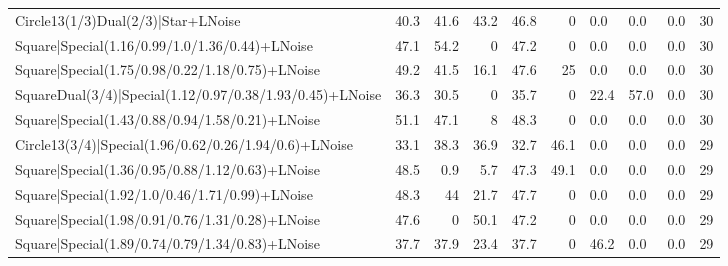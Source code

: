 \begin{tabular}{lrrrrrlllr}
 Circle13(1/3)Dual(2/3)|Star+LNoise                              &            40.3 &            41.6 &            43.2 &            46.8 &            0   & 0.0             & 0.0            & 0.0            &           30 \\
 Square|Special(1.16/0.99/1.0/1.36/0.44)+LNoise                  &            47.1 &            54.2 &             0   &            47.2 &            0   & 0.0             & 0.0            & 0.0            &           30 \\
 Square|Special(1.75/0.98/0.22/1.18/0.75)+LNoise                 &            49.2 &            41.5 &            16.1 &            47.6 &           25   & 0.0             & 0.0            & 0.0            &           30 \\
 SquareDual(3/4)|Special(1.12/0.97/0.38/1.93/0.45)+LNoise        &            36.3 &            30.5 &             0   &            35.7 &            0   & 22.4            & 57.0           & 0.0            &           30 \\
 Square|Special(1.43/0.88/0.94/1.58/0.21)+LNoise                 &            51.1 &            47.1 &             8   &            48.3 &            0   & 0.0             & 0.0            & 0.0            &           30 \\
 Circle13(3/4)|Special(1.96/0.62/0.26/1.94/0.6)+LNoise           &            33.1 &            38.3 &            36.9 &            32.7 &           46.1 & 0.0             & 0.0            & 0.0            &           29 \\
 Square|Special(1.36/0.95/0.88/1.12/0.63)+LNoise                 &            48.5 &             0.9 &             5.7 &            47.3 &           49.1 & 0.0             & 0.0            & 0.0            &           29 \\
 Square|Special(1.92/1.0/0.46/1.71/0.99)+LNoise                  &            48.3 &            44   &            21.7 &            47.7 &            0   & 0.0             & 0.0            & 0.0            &           29 \\
 Square|Special(1.98/0.91/0.76/1.31/0.28)+LNoise                 &            47.6 &             0   &            50.1 &            47.2 &            0   & 0.0             & 0.0            & 0.0            &           29 \\
 Square|Special(1.89/0.74/0.79/1.34/0.83)+LNoise                 &            37.7 &            37.9 &            23.4 &            37.7 &            0   & 46.2            & 0.0            & 0.0            &           29 \\

\end{tabular}
